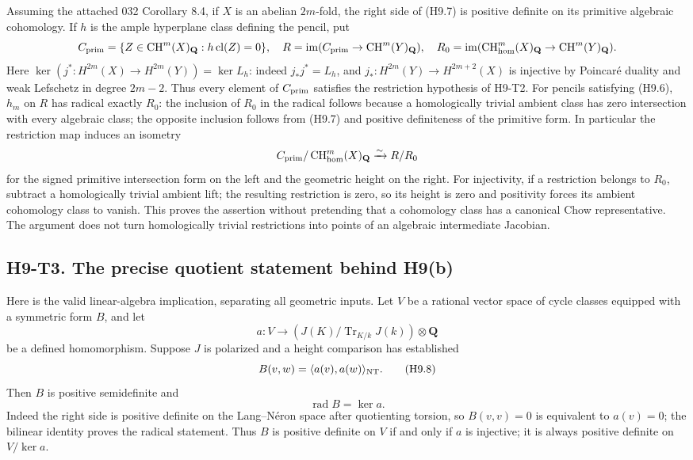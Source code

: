 \documentclass[11pt,a4paper]{article}
\begin{document}
Assuming the attached 032 Corollary 8.4, if $X$ is an abelian $2m$-fold,
the right side of (H9.7) is positive definite on its primitive algebraic
cohomology. If $h$ is the ample hyperplane class defining the pencil, put
\[
 C_{\rm prim}=\{Z\in\operatorname{CH}^m(X)_{\mathbf Q}:
                          h\operatorname{cl}(Z)=0\},\quad
 R=\operatorname{im}(C_{\rm prim}\to\operatorname{CH}^m(Y)_{\mathbf Q}),
 \quad
 R_0=\operatorname{im}(\operatorname{CH}^m_{\rm hom}(X)_{\mathbf Q}
                         \to\operatorname{CH}^m(Y)_{\mathbf Q}).
\]
Here $\ker(j^*:H^{2m}(X)\to H^{2m}(Y))=\ker L_h$: indeed
$j_*j^*=L_h$, and $j_*:H^{2m}(Y)\to H^{2m+2}(X)$ is injective by
Poincar\'e duality and weak Lefschetz in degree $2m-2$. Thus every element
of $C_{\rm prim}$ satisfies the restriction hypothesis of H9-T2.
For pencils satisfying (H9.6), $h_m$ on $R$ has radical exactly $R_0$:
the inclusion of $R_0$ in the radical follows because a homologically
trivial ambient class has zero intersection with every algebraic class;
the opposite inclusion follows from (H9.7) and positive definiteness of
the primitive form. In particular the restriction map induces an
isometry
\[
 C_{\rm prim}/\operatorname{CH}^m_{\rm hom}(X)_{\mathbf Q}
       \xrightarrow{\sim}R/R_0
\]
for the signed primitive intersection form on the left and the geometric
height on the right. For injectivity, if a restriction belongs to $R_0$,
subtract a homologically trivial ambient lift; the resulting restriction
is zero, so its height is zero and positivity forces its ambient
cohomology class to vanish. This proves the assertion without pretending
that a cohomology class has a canonical Chow representative. The argument
does not turn homologically trivial restrictions into points of an
algebraic intermediate Jacobian.

\subsection*{H9-T3. The precise quotient statement behind H9(b)}

Here is the valid linear-algebra implication, separating all geometric
inputs. Let $V$ be a rational vector space of cycle classes equipped with
a symmetric form $B$, and let
\[
 a:V\longrightarrow
 (J(K)/\operatorname{Tr}_{K/k}J(k))\otimes\mathbf Q
\]
be a defined homomorphism. Suppose $J$ is polarized and a height comparison
has established
\[
 B(v,w)=\langle a(v),a(w)\rangle_{\rm NT}.
                                                        \tag{H9.8}
\]
Then $B$ is positive semidefinite and
\[
 \operatorname{rad}B=\ker a.
\]
Indeed the right side is positive definite on the Lang--N\'eron space
after quotienting torsion, so $B(v,v)=0$ is equivalent to $a(v)=0$; the
bilinear identity proves the radical statement. Thus $B$ is positive
definite on $V$ if and only if $a$ is injective; it is always positive
definite on $V/\ker a$.
\end{document}

